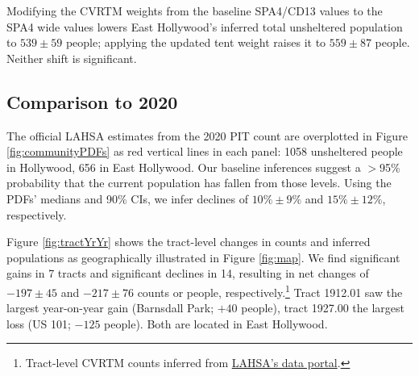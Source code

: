 \documentclass[11pt,twocolumn]{article}
\def\resp{respectively}
\def\dh{10\%\pm9\%}
\def\de{15\%\pm12\%}
\begin{document}
Modifying the CVRTM weights from the baseline SPA4/CD13 values to the SPA4 wide values 
lowers East Hollywood's inferred total unsheltered population to $539\pm59$ people; applying
the updated tent weight raises it to $559\pm87$ people. Neither shift is significant.




\subsection{Comparison to 2020}
\label{sec:comp}

The official LAHSA estimates from the 2020 PIT count are overplotted in Figure \ref{fig:communityPDFs} 
as red vertical lines in each panel: 1058 unsheltered people in Hollywood, 656 in East Hollywood.
Our baseline inferences suggest a $>$95\% probability that the current population has fallen from 
those levels. Using the PDFs' medians and 90\% CIs, we infer declines of $\dh$ and 
$\de$, \resp. 

Figure \ref{fig:tractYrYr} shows the tract-level changes in counts and inferred populations as
geographically illustrated in Figure \ref{fig:map}. We find significant gains in 7 tracts and significant 
declines in 14, resulting in net changes of $-197\pm45$ and $-217\pm76$ counts or people, \resp.\footnote{Tract-level 
CVRTM counts inferred from \href{https://www.lahsa.org/data?id=45-2020-homeless-count-by-community-city}
{LAHSA's data portal}.} Tract 1912.01 saw the largest year-on-year gain (Barnsdall Park; $+40$ people), tract 
1927.00 the largest loss (US 101; $-125$ people). Both are located in East Hollywood.
\end{document}
